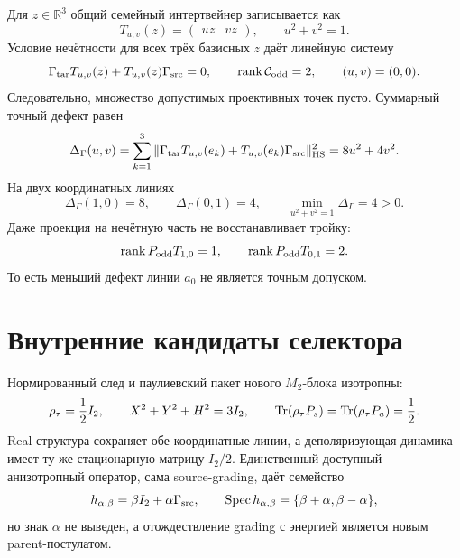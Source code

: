 Для $z\in\mathbb R^3$ общий семейный интертвейнер записывается как
\begin{equation}
 T_{u,v}(z)=\begin{pmatrix}uz&vz\end{pmatrix},
 \qquad u^2+v^2=1.
 \label{eq:v8-baryon-c0-source-line-general-family-map}
\end{equation}
Условие нечётности для всех трёх базисных $z$ даёт линейную систему
\begin{equation}
 \Gamma_{\rm tar}T_{u,v}(z)+T_{u,v}(z)\Gamma_{\rm src}=0,
 \qquad \operatorname{rank}\mathcal C_{\rm odd}=2,\qquad (u,v)=(0,0).
 \label{eq:v8-baryon-c0-source-line-oddness-kernel-zero}
\end{equation}
Следовательно, множество допустимых проективных точек пусто. Суммарный
точный дефект равен
\begin{equation}
 \Delta_{\Gamma}(u,v)=
 \sum_{k=1}^3\|\Gamma_{\rm tar}T_{u,v}(e_k)
 +T_{u,v}(e_k)\Gamma_{\rm src}\|_{\rm HS}^2
 =8u^2+4v^2.
 \label{eq:v8-baryon-c0-source-line-parity-defect}
\end{equation}
На двух координатных линиях
\begin{equation}
 \Delta_{\Gamma}(1,0)=8,\qquad
 \Delta_{\Gamma}(0,1)=4,\qquad
 \min_{u^2+v^2=1}\Delta_{\Gamma}=4>0.
 \label{eq:v8-baryon-c0-source-line-axis-defects}
\end{equation}
Даже проекция на нечётную часть не восстанавливает тройку:
\begin{equation}
 \operatorname{rank} P_{\rm odd}T_{1,0}=1,\qquad
 \operatorname{rank} P_{\rm odd}T_{0,1}=2.
 \label{eq:v8-baryon-c0-source-line-odd-projection-ranks}
\end{equation}
То есть меньший дефект линии $a_0$ не является точным допуском.

\section{Внутренние кандидаты селектора}

Нормированный след и паулиевский пакет нового $M_2$-блока изотропны:
\begin{equation}
 \rho_\tau=\frac12I_2,\qquad
 X^2+Y^2+H^2=3I_2,\qquad
 \operatorname{Tr}(\rho_\tau P_s)=\operatorname{Tr}(\rho_\tau P_a)=\frac12.
 \label{eq:v8-baryon-c0-source-line-trace-pauli-isotropy}
\end{equation}
Real-структура сохраняет обе координатные линии, а деполяризующая динамика
имеет ту же стационарную матрицу $I_2/2$. Единственный доступный
анизотропный оператор, сама source-grading, даёт семейство
\begin{equation}
 h_{\alpha,\beta}=\beta I_2+\alpha\Gamma_{\rm src},
 \qquad \operatorname{Spec} h_{\alpha,\beta}=\{\beta+\alpha,\beta-\alpha\},
 \label{eq:v8-baryon-c0-source-line-grading-hamiltonian}
\end{equation}
но знак $\alpha$ не выведен, а отождествление grading с энергией является
новым parent-постулатом.

